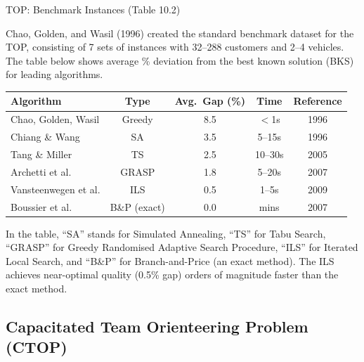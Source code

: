 \documentclass[aspectratio=169,10pt]{beamer}
\begin{document}
\begin{frame}[allowframebreaks]{TOP: Benchmark Instances (Table 10.2)}

  Chao, Golden, and Wasil (1996) created the standard benchmark dataset
  for the TOP, consisting of 7 sets of instances with 32--288 customers
  and 2--4 vehicles.
  The table below shows average \% deviation from the best known solution
  (BKS) for leading algorithms.

  \medskip
  \begin{center}
  \small
  \begin{tabular}{lcccc}
    \toprule
    \textbf{Algorithm} & \textbf{Type} & \textbf{Avg.\ Gap (\%)} & \textbf{Time} & \textbf{Reference} \\
    \midrule
    Chao, Golden, Wasil & Greedy    & 8.5  & $<$1s   & 1996 \\
    Chiang \& Wang      & SA        & 3.5  & 5--15s  & 1996 \\
    Tang \& Miller      & TS        & 2.5  & 10--30s & 2005 \\
    Archetti et al.     & GRASP     & 1.8  & 5--20s  & 2007 \\
    Vansteenwegen et al.& ILS       & 0.5  & 1--5s   & 2009 \\
    Boussier et al.     & B\&P (exact) & 0.0 & mins  & 2007 \\
    \bottomrule
  \end{tabular}
  \end{center}

  \medskip
  In the table, ``SA'' stands for Simulated Annealing, ``TS'' for
  Tabu Search, ``GRASP'' for Greedy Randomised Adaptive Search Procedure,
  ``ILS'' for Iterated Local Search, and ``B\&P'' for Branch-and-Price
  (an exact method).
  The ILS achieves near-optimal quality (0.5\% gap) orders of magnitude
  faster than the exact method.

\end{frame}

\subsection{Capacitated Team Orienteering Problem (CTOP)}
\end{document}
